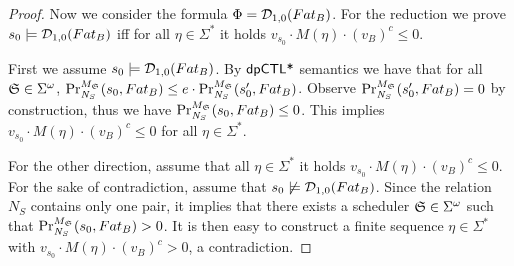 \begin{proof}
Now we consider the formula  $\Phi = \dpriv{1}{0} (F at_B)$. For the reduction we prove $s_0\models \dpriv{1}{0} (F at_B)$ iff for all $\eta\in\Sigma^*$ it holds $v_{s_0}\cdot M(\eta)\cdot (v_B)^c \leq 0$.

First we assume $s_0\models \dpriv{1}{0} (F at_B)$. By $\dpCTLstar$ semantics we have that for all $\scheduler{S}\in\Sigma^\omega$,
$\myPr{s_0}{M_{\scheduler{S}}}{\neighbor{S}}{F at_B} \leq
  e \cdot
  \myPr{s_0'}{M_{\scheduler{S}}}{\neighbor{S}}{F at_B}$. Observe $\myPr{s_0'}{M_{\scheduler{S}}}{\neighbor{S}}{F at_B}=0$ by construction, thus we have
$\myPr{s_0}{M_{\scheduler{S}}}{\neighbor{S}}{F at_B} \leq
 0$. This implies  $v_{s_0}\cdot M(\eta)\cdot (v_B)^c \leq 0$ for all $\eta\in\Sigma^*$.

 For the other direction, assume that all $\eta\in\Sigma^*$ it holds $v_{s_0}\cdot M(\eta)\cdot (v_B)^c \leq 0$. For the sake of contradiction, assume that $s_0\not\models \dpriv{1}{0} (F at_B)$. Since the relation $N_S$ contains only one pair, it implies that there exists a scheduler $\scheduler{S}\in\Sigma^\omega$ such that $\myPr{s_0}{M_{\scheduler{S}}}{\neighbor{S}}{F at_B} >0$. It is then easy to construct a finite sequence $\eta\in\Sigma^*$ with  $v_{s_0}\cdot M(\eta)\cdot (v_B)^c > 0$, a contradiction.
\end{proof}
